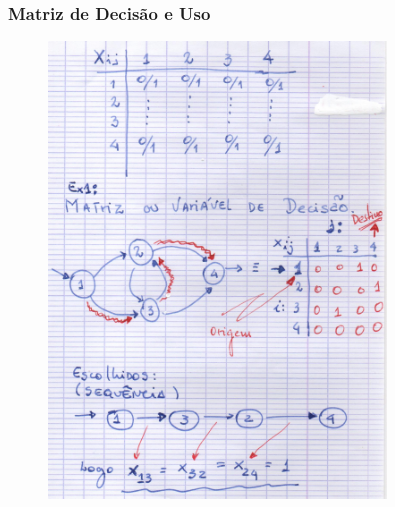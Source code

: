 \documentclass{beamer}
\begin{document}
\begin{frame}
	\frametitle{Matriz de Decisão e Uso}
	
	\begin{figure}[tbp]
		\includegraphics[width=0.8\textwidth , height=0.8\textheight]{04_matriz_decisao_uso.pdf}
		\centering
	\end{figure}
\end{frame}
\end{document}
